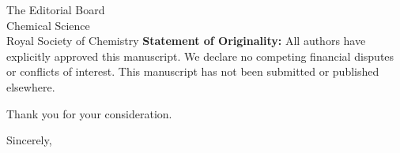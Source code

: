 \documentclass[11pt,a4paper]{letter}
\begin{document}
\begin{letter}{
The Editorial Board\\
Chemical Science\\
Royal Society of Chemistry
}
\textbf{Statement of Originality:}
All authors have explicitly approved this manuscript. We declare no competing financial disputes or conflicts of interest. This manuscript has not been submitted or published elsewhere.

Thank you for your consideration.

\closing{Sincerely,}


\end{letter}
\end{document}
